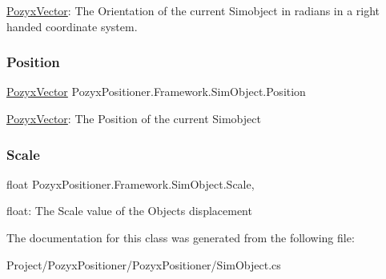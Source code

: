 \hyperlink{struct_pozyx_positioner_1_1_framework_1_1_pozyx_vector}{Pozyx\+Vector}\+: The Orientation of the current Simobject in radians in a right handed coordinate system. 

\mbox{\label{class_pozyx_positioner_1_1_framework_1_1_sim_object_a1d2b2ac8c37883939483d4682826db21}} 
\subsubsection{\texorpdfstring{Position}{Position}}
{\footnotesize\ttfamily \hyperlink{struct_pozyx_positioner_1_1_framework_1_1_pozyx_vector}{Pozyx\+Vector} Pozyx\+Positioner.\+Framework.\+Sim\+Object.\+Position\hspace{0.3cm}{\ttfamily [get]}}



\hyperlink{struct_pozyx_positioner_1_1_framework_1_1_pozyx_vector}{Pozyx\+Vector}\+: The Position of the current Simobject 

\mbox{\label{class_pozyx_positioner_1_1_framework_1_1_sim_object_ab9f89c4e327e25286f0269960d0d2de8}} 
\subsubsection{\texorpdfstring{Scale}{Scale}}
{\footnotesize\ttfamily float Pozyx\+Positioner.\+Framework.\+Sim\+Object.\+Scale\hspace{0.3cm}{\ttfamily [get]}, {\ttfamily [set]}}



float\+: The Scale value of the Object\textquotesingle{}s displacement 



The documentation for this class was generated from the following file\+:\begin{DoxyCompactItemize}
\item 
Project/\+Pozyx\+Positioner/\+Pozyx\+Positioner/Sim\+Object.\+cs\end{DoxyCompactItemize}
